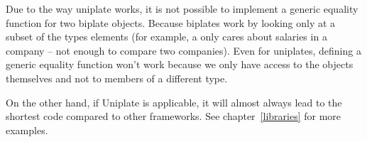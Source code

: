 Due to the way uniplate works, it is not possible to implement a generic
equality function for two biplate objects. Because biplates work by looking only
at a subset of the types elements (for example, a 
only cares about salaries in a company -- not enough to compare two companies). Even
for uniplates, defining a generic equality function won't work because we
only have access to the objects themselves and not to members of a different
type.

On the other hand, if Uniplate is applicable, it will almost always lead to
the shortest code compared to other frameworks. See chapter~\ref{libraries}
for more examples.

